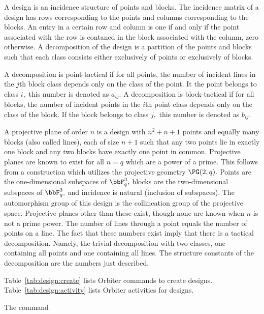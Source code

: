 A design is an incidence structure of points and blocks. 
The incidence matrix of a design has rows corresponding to the points 
and columns corresponding to the blocks. 
An entry in a certain row and column is one if and only if the point associated with the row 
is contaned in the block associated with the column, zero otherwise.
A decomposition of the design is a partition of the points and blocks such that 
each class consists either exclusively of points or exclusively of blocks. 

\bigskip


A decomposition is point-tactical if for all points, 
the number of incident lines in the $j$th block class depends only on the class of the point.
It the point belongs to class $i,$ this number is denoted as $a_{ij}.$
A decomposition is block-tactical if for all blocks, 
the number of incident points in the $i$th point class depends only on the class of the block.
If the block belongs to class $j,$ this number is denoted as $b_{ij}.$

\bigskip

A projective plane of order $n$ is a 
design with $n^2+n+1$ points and equally 
many blocks (also called lines), each of size $n+1$ such that 
any two points lie in exactly one block and any two blocks have exactly one point in common.
Projective planes are known to exist 
for all $n = q$ which are a power of a prime. 
This follows from a construction which utilizes the projective geometry $\PG(2,q).$ 
Points are the one-dimensional subspaces of $\bbF_q^3,$
blocks are the two-dimensional subspaces of $\bbF_q^3,$ and
incidence is natural (inclusion of subspaces). 
The automorphism group of this design is the collineation group of the projective space.
Projective planes other than these exist, though none are known when $n$ is not a prime power.
The number of lines through a point equals the number of points on a line. 
The fact that these numbers exist imply 
that there is a tactical decomposition. 
Namely, the trivial decomposition with two classes, 
one containing all points and one containing all lines.
The structure constants of the decomposition are the numbers just described.

\bigskip

Table~\ref{tab:design:create} 
lists Orbiter commands to create designs.
Table~\ref{tab:design:activity}
lists Orbiter activities for designs.

The command 

